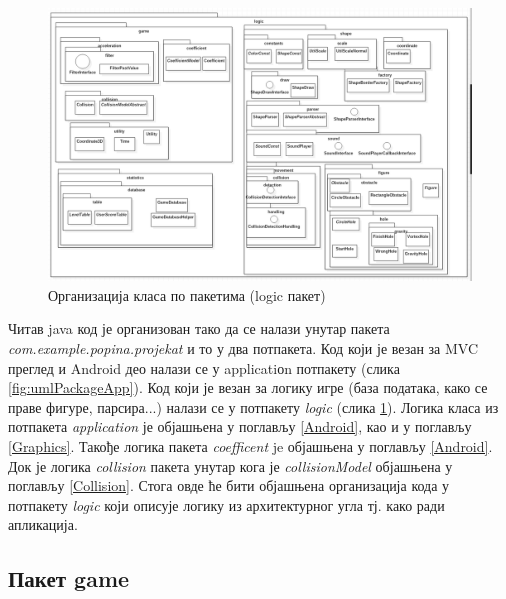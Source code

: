 \begin{figure}[htb!]
\begin{center}
\includegraphics[scale=.6]{pictures/UML/package/logic}
\caption{Организација класа по пакетима (logic пакет)}\label{fig:umlPackageLog}
\end{center}
\end{figure}

Читав java код је организован тако да се налази унутар пакета \emph{com.example.popina.projekat} и то у два потпакета. Код који је везан за MVC преглед и Android део налази се у applicatiоn потпакету (слика \ref{fig:umlPackageApp}). Код који је везан за логику игре (база података, како се праве фигуре, парсира...) налази се у потпакету \emph{logic} (слика \ref{fig:umlPackageLog}). Логика класа из потпакета \emph{application} је објашњена у поглављу \ref{Android}, као и у поглављу \ref{Graphics}. Такође логика пакета \emph{coefficent} je објашњена у поглављу  \ref{Android}. Док је логика \emph{collision} пакета унутар кога је \emph{collisionModel} објашњена у поглављу \ref{Collision}. Стога овде ће бити објашњена организација кода у потпакету \emph{logic }који описује логику из архитектурног угла тј. како ради апликација. 

\subsection{Пакет game}
